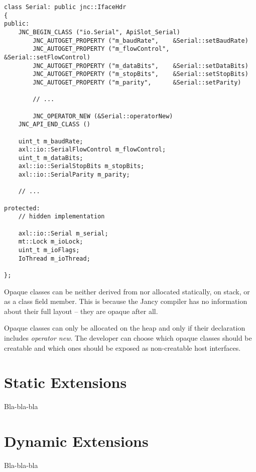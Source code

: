 \documentclass[oneside]{book}
\begin{document}
\begin{lstlisting}
class Serial: public jnc::IfaceHdr
{
public:
    JNC_BEGIN_CLASS ("io.Serial", ApiSlot_Serial)
        JNC_AUTOGET_PROPERTY ("m_baudRate",    &Serial::setBaudRate)
        JNC_AUTOGET_PROPERTY ("m_flowControl", &Serial::setFlowControl)
        JNC_AUTOGET_PROPERTY ("m_dataBits",    &Serial::setDataBits)
        JNC_AUTOGET_PROPERTY ("m_stopBits",    &Serial::setStopBits)
        JNC_AUTOGET_PROPERTY ("m_parity",      &Serial::setParity)

        // ...

        JNC_OPERATOR_NEW (&Serial::operatorNew)
    JNC_API_END_CLASS ()

    uint_t m_baudRate;
    axl::io::SerialFlowControl m_flowControl;
    uint_t m_dataBits;
    axl::io::SerialStopBits m_stopBits;
    axl::io::SerialParity m_parity;

    // ...

protected:
    // hidden implementation

    axl::io::Serial m_serial;
    mt::Lock m_ioLock;
    uint_t m_ioFlags;
    IoThread m_ioThread;

};
\end{lstlisting}

Opaque classes can be neither derived from nor allocated statically, on stack, or as a class field member. This is because the Jancy compiler has no information about their full layout -- they are opaque after all.

Opaque classes can only be allocated on the heap and only if their declaration includes \emph{operator new}. The developer can choose which opaque classes should be creatable and which ones should be exposed as non-creatable host interfaces.

\section{Static Extensions}

Bla-bla-bla

\section{Dynamic Extensions}

Bla-bla-bla
 
\end{document}
